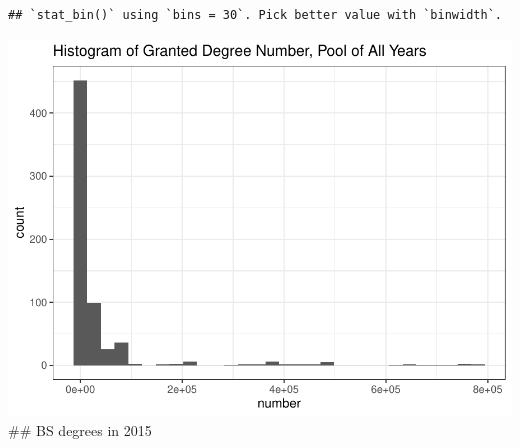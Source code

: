 \documentclass[
  12pt,
]{article}
\begin{document}
\begin{verbatim}
## `stat_bin()` using `bins = 30`. Pick better value with `binwidth`.
\end{verbatim}

\includegraphics{hw1_sol_files/figure-latex/unnamed-chunk-7-1.pdf} \#\#
BS degrees in 2015
\end{document}
